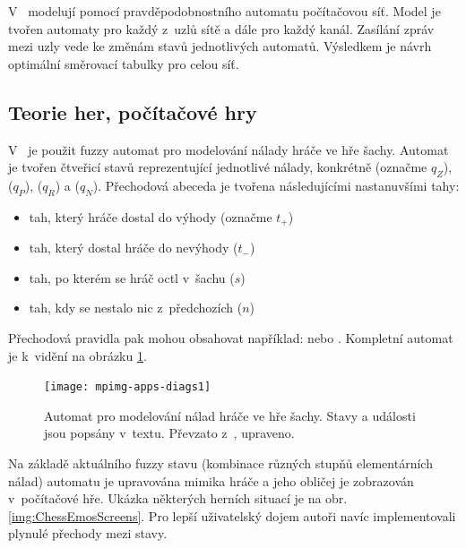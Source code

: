 V~\cite{Niz-ModComComNetViaPrAu} modelují pomocí pravděpodobnostního automatu počítačovou síť. Model je tvořen automaty pro každý z~uzlů sítě a dále pro každý kanál. Zasílání zpráv mezi uzly vede ke změnám stavů jednotlivých automatů. Výsledkem je návrh optimální směrovací tabulky pro celou síť.

\subsection{Teorie her, počítačové hry}
V~\cite{AlvJoaCru-FuStMaAppEmoModEleGamCha} je použit fuzzy automat pro modelování nálady hráče ve hře šachy. Automat je tvořen čtveřicí stavů reprezentující jednotlivé  nálady, konkrétně  (označme $q_Z$),  ($q_P$),  ($q_R$) a  ($q_N$). Přechodová abeceda je tvořena následujícími nastanuvšími tahy:
\begin{itemize}
 \item tah, který hráče dostal do výhody (označme $t_{+}$)
 \item tah, který dostal hráče do nevýhody ($t_{-}$)
 \item tah, po kterém se hráč octl v~šachu ($s$)
 \item tah, kdy se nestalo nic z~předchozích ($n$)
\end{itemize}

Přechodová pravidla pak mohou obsahovat například:  nebo . Kompletní automat je k~vidění na obrázku \ref{img:ChessEmosFA}.

\begin{figure}
 \centering
 \texttt{[image: mpimg-apps-diags1]}
 
 \caption[Automat pro modelování nálad hráče ve hře šachy]{Automat pro modelování nálad hráče ve hře šachy. Stavy a události jsou popsány v~textu. Převzato z~\cite{AlvJoaCru-FuStMaAppEmoModEleGamCha}, upraveno.}
 \label{img:ChessEmosFA}
\end{figure}

Na základě aktuálního fuzzy stavu (kombinace různých stupňů elementárních nálad) automatu je upravována mimika hráče a jeho obličej je zobrazován v~počítačové hře. Ukázka některých herních situací je na obr. \ref{img:ChessEmosScreens}. Pro lepší uživatelský dojem autoři navíc implementovali plynulé přechody mezi stavy.


